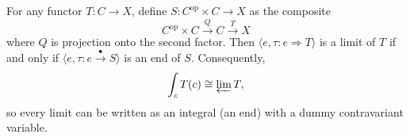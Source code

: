  For any functor $T : C \to X$, define $S : C^{\mathrm{op}} \times C \to X$ as the composite
$$
C^{\mathrm{op}} \times C \xrightarrow{Q} C \xrightarrow{T} X
$$
where $Q$ is projection onto the second factor. Then $\langle e, \tau : e \Rightarrow T \rangle$ is a limit of $T$ if and only if $\langle e, \tau : e \xrightarrow{\bullet} S \rangle$ is an end of $S$. Consequently,
$$
\int_c T(c) \cong \varprojlim T,
$$
so every limit can be written as an integral (an end) with a dummy contravariant variable.
